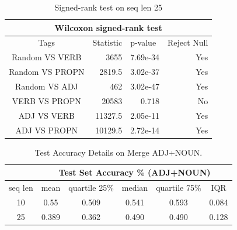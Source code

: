 \documentclass[12pt]{article}
\begin{document}
\begin{table}[!h]

\begin{tabular}{|crrr|}
\hline
\multicolumn{4}{|c|}{Wilcoxon signed-rank test}                                                                                           \\ \hline
\multicolumn{1}{|c|}{Tags}            & \multicolumn{1}{c|}{Statistic} & \multicolumn{1}{l|}{p-value}  & \multicolumn{1}{l|}{Reject Null} \\ \hline
\multicolumn{1}{|c|}{Random VS VERB}  & \multicolumn{1}{r|}{3655}      & \multicolumn{1}{r|}{7.69e-34} & Yes                              \\ \hline
\multicolumn{1}{|c|}{Random VS PROPN} & \multicolumn{1}{r|}{2819.5}    & \multicolumn{1}{r|}{3.02e-37} & Yes                              \\ \hline
\multicolumn{1}{|c|}{Random VS ADJ}   & \multicolumn{1}{r|}{462}       & \multicolumn{1}{r|}{3.02e-47} & Yes                              \\ \hline
\multicolumn{1}{|c|}{VERB VS PROPN}   & \multicolumn{1}{r|}{20583}     & \multicolumn{1}{r|}{0.718}    & No                               \\ \hline
\multicolumn{1}{|c|}{ADJ VS VERB}     & \multicolumn{1}{r|}{11327.5}   & \multicolumn{1}{r|}{2.05e-11} & Yes                              \\ \hline
\multicolumn{1}{|c|}{ADJ VS PROPN}    & \multicolumn{1}{r|}{10129.5}   & \multicolumn{1}{r|}{2.72e-14} & Yes                              \\ \hline
\end{tabular}
\caption{Signed-rank test on seq len 25}
\label{appendix:signedranktestseq25}
  
\end{table}

\begin{table}[!h]
\begin{tabular}{c|ccccc|}
\cline{2-6}
\multicolumn{1}{l|}{}         & \multicolumn{5}{c|}{Test Set Accuracy \% (ADJ+NOUN)}                                                                                       \\ \hline
\multicolumn{1}{|c|}{seq len} & \multicolumn{1}{c|}{mean}  & \multicolumn{1}{c|}{quartile 25\%} & \multicolumn{1}{c|}{median} & \multicolumn{1}{c|}{quartile 75\%} & IQR   \\ \hline
\multicolumn{1}{|c|}{10}      & \multicolumn{1}{c|}{0.55}  & \multicolumn{1}{c|}{0.509}         & \multicolumn{1}{c|}{0.541}  & \multicolumn{1}{c|}{0.593}         & 0.084 \\ \hline
\multicolumn{1}{|c|}{25}      & \multicolumn{1}{c|}{0.389} & \multicolumn{1}{c|}{0.362}         & \multicolumn{1}{c|}{0.490}  & \multicolumn{1}{c|}{0.490}         & 0.128 \\ \hline
\end{tabular}
\caption{Test Accuracy Details on Merge ADJ+NOUN.}
\label{appendix:adjnounMerge}
\end{table}
\end{document}

